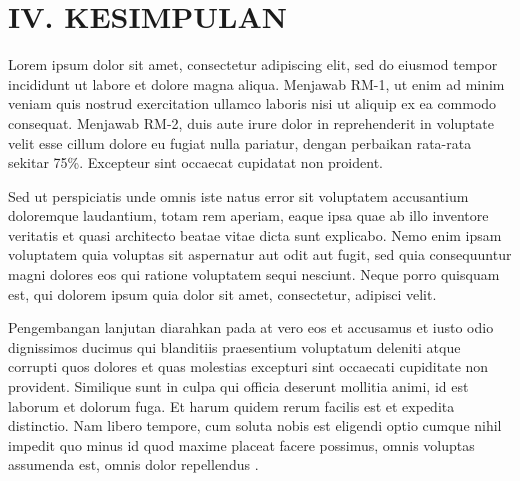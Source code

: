 \section{IV. KESIMPULAN}

Lorem ipsum dolor sit amet, consectetur adipiscing elit, sed do eiusmod tempor
incididunt ut labore et dolore magna aliqua. Menjawab RM-1, ut enim ad minim
veniam quis nostrud exercitation ullamco laboris nisi ut aliquip ex ea commodo
consequat. Menjawab RM-2, duis aute irure dolor in reprehenderit in voluptate
velit esse cillum dolore eu fugiat nulla pariatur, dengan perbaikan rata-rata
sekitar 75\%. Excepteur sint occaecat cupidatat non proident.

Sed ut perspiciatis unde omnis iste natus error sit voluptatem accusantium
doloremque laudantium, totam rem aperiam, eaque ipsa quae ab illo inventore
veritatis et quasi architecto beatae vitae dicta sunt explicabo. Nemo enim ipsam
voluptatem quia voluptas sit aspernatur aut odit aut fugit, sed quia
consequuntur magni dolores eos qui ratione voluptatem sequi nesciunt. Neque
porro quisquam est, qui dolorem ipsum quia dolor sit amet, consectetur, adipisci
velit.

Pengembangan lanjutan diarahkan pada at vero eos et accusamus et iusto odio
dignissimos ducimus qui blanditiis praesentium voluptatum deleniti atque
corrupti quos dolores et quas molestias excepturi sint occaecati cupiditate non
provident. Similique sunt in culpa qui officia deserunt mollitia animi, id est
laborum et dolorum fuga. Et harum quidem rerum facilis est et expedita
distinctio. Nam libero tempore, cum soluta nobis est eligendi optio cumque nihil
impedit quo minus id quod maxime placeat facere possimus, omnis voluptas
assumenda est, omnis dolor repellendus \cite{ContohSatu2024}.

\lipsum[21-23]
